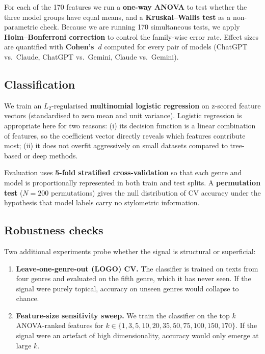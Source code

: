 \documentclass[11pt,a4paper]{article}
\begin{document}
For each of the 170 features we run a \textbf{one-way ANOVA} to test
whether the three model groups have equal means, and a
\textbf{Kruskal--Wallis test} as a non-parametric check. Because we
are running 170 simultaneous tests, we apply \textbf{Holm--Bonferroni
correction} to control the family-wise error rate. Effect sizes are
quantified with \textbf{Cohen's~$d$} computed for every pair of
models (ChatGPT vs.\ Claude, ChatGPT vs.\ Gemini, Claude vs.\ Gemini).

\subsection{Classification}

We train an $L_2$-regularised \textbf{multinomial logistic regression}
on z-scored feature vectors (standardised to zero mean and unit variance).
Logistic regression is appropriate here for two reasons: (i) its
decision function is a linear combination of features, so the
coefficient vector directly reveals which features contribute most;
(ii) it does not overfit aggressively on small datasets compared to
tree-based or deep methods.

Evaluation uses \textbf{5-fold stratified cross-validation} so that
each genre and model is proportionally represented in both train
and test splits. A \textbf{permutation test} ($N = 200$ permutations)
gives the null distribution of CV accuracy under the hypothesis that
model labels carry no stylometric information.

\subsection{Robustness checks}

Two additional experiments probe whether the signal is structural or
superficial:

\begin{enumerate}[leftmargin=*, nosep]
\item \textbf{Leave-one-genre-out (LOGO) CV.} The classifier is
      trained on texts from four genres and evaluated on the fifth
      genre, which it has never seen. If the signal were purely
      topical, accuracy on unseen genres would collapse to chance.

\item \textbf{Feature-size sensitivity sweep.} We train the
      classifier on the top $k$ ANOVA-ranked features for
      $k \in \{1, 3, 5, 10, 20, 35, 50, 75, 100, 150, 170\}$.
      If the signal were an artefact of high dimensionality,
      accuracy would only emerge at large $k$.
\end{enumerate}
\end{document}
